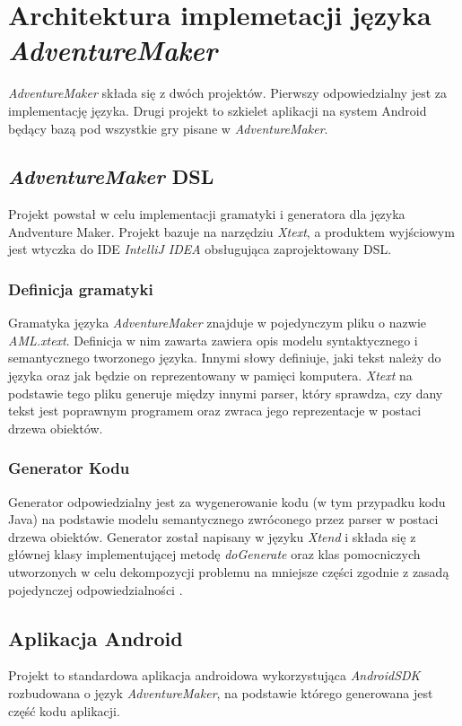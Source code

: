 \documentclass[openright]{xmgr}
\begin{document}
\chapter{Architektura implemetacji języka \textit{AdventureMaker}}

\textit{AdventureMaker} składa się z dwóch projektów. Pierwszy odpowiedzialny jest za implementację języka. Drugi projekt to szkielet aplikacji na system Android będący bazą pod wszystkie gry pisane w \textit{AdventureMaker}. 

\section{\textit{AdventureMaker} DSL} 
Projekt powstał w celu implementacji gramatyki i generatora dla języka Andventure Maker. Projekt bazuje na narzędziu \textit{Xtext}\cite{Xtext:2017:Doc}, a produktem wyjściowym jest wtyczka do IDE \textit{IntelliJ IDEA} obsługująca zaprojektowany DSL. 

\subsection{Definicja gramatyki} 

Gramatyka języka \textit{AdventureMaker} znajduje w pojedynczym pliku o nazwie \textit{AML.xtext}. Definicja w nim zawarta zawiera opis modelu syntaktycznego i semantycznego tworzonego języka. Innymi słowy definiuje, jaki tekst należy do języka oraz jak będzie on reprezentowany w pamięci komputera. \textit{Xtext} na podstawie tego pliku generuje między innymi parser, który sprawdza, czy dany tekst jest poprawnym programem oraz zwraca jego reprezentacje w postaci drzewa obiektów.

\subsection{Generator Kodu}
Generator odpowiedzialny jest za wygenerowanie kodu (w tym przypadku kodu Java) na podstawie modelu semantycznego zwróconego przez parser w postaci drzewa obiektów. Generator został napisany w języku \textit{Xtend} i składa się z głównej klasy implementującej metodę \textit{doGenerate} oraz klas pomocniczych utworzonych w celu dekompozycji problemu na mniejsze części zgodnie z zasadą pojedynczej odpowiedzialności \cite{CleanCode:2005}.

\section{Aplikacja Android}
Projekt to standardowa aplikacja androidowa wykorzystująca \textit{AndroidSDK} rozbudowana o język \textit{AdventureMaker}, na podstawie którego generowana jest część kodu aplikacji.
\end{document}
